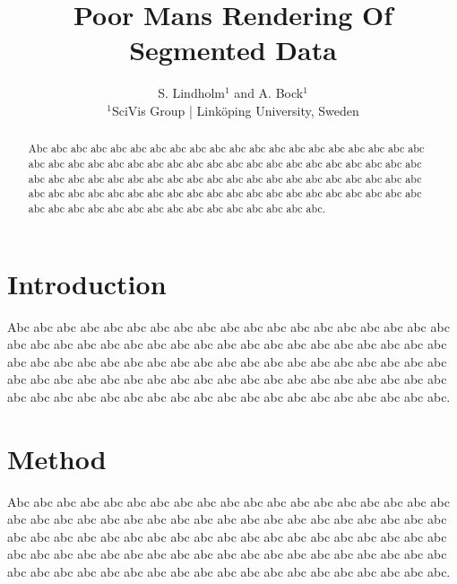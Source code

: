 \documentclass{egpubl}
\title[PMS]%
      {Poor Mans Rendering Of Segmented Data}
\author[S. Lindholm \& A. Bock]
       {S. Lindholm$^{1}$
        and A. Bock$^{1}$
        \\
         $^1$SciVis Group | Link\"{o}ping University, Sweden
       }
\begin{document}

\maketitle

\begin{abstract}
   Abc abc abc abc abc abc abc abc abc abc abc abc abc abc abc abc abc abc abc abc abc abc abc abc abc abc abc abc abc abc abc abc abc abc abc abc abc abc abc abc abc abc abc abc abc abc abc abc abc abc abc abc abc abc abc abc abc abc abc abc abc abc abc abc abc abc abc abc abc abc abc abc abc abc abc abc abc abc abc abc abc abc abc abc abc abc abc abc abc abc abc abc abc abc abc.

\begin{classification} %
\end{classification}

\end{abstract}





\section{Introduction}

   Abc abc abc abc abc abc abc abc abc abc abc abc abc abc abc abc abc abc abc abc abc abc abc abc abc abc abc abc abc abc abc abc abc abc abc abc abc abc abc abc abc abc abc abc abc abc abc abc abc abc abc abc abc abc abc abc abc abc abc abc abc abc abc abc abc abc abc abc abc abc abc abc abc abc abc abc abc abc abc abc abc abc abc abc abc abc abc abc abc abc abc abc abc abc abc.

\cite{Bishop2006}

\section{Method}

   Abc abc abc abc abc abc abc abc abc abc abc abc abc abc abc abc abc abc abc abc abc abc abc abc abc abc abc abc abc abc abc abc abc abc abc abc abc abc abc abc abc abc abc abc abc abc abc abc abc abc abc abc abc abc abc abc abc abc abc abc abc abc abc abc abc abc abc abc abc abc abc abc abc abc abc abc abc abc abc abc abc abc abc abc abc abc abc abc abc abc abc abc abc abc abc.
\end{document}
